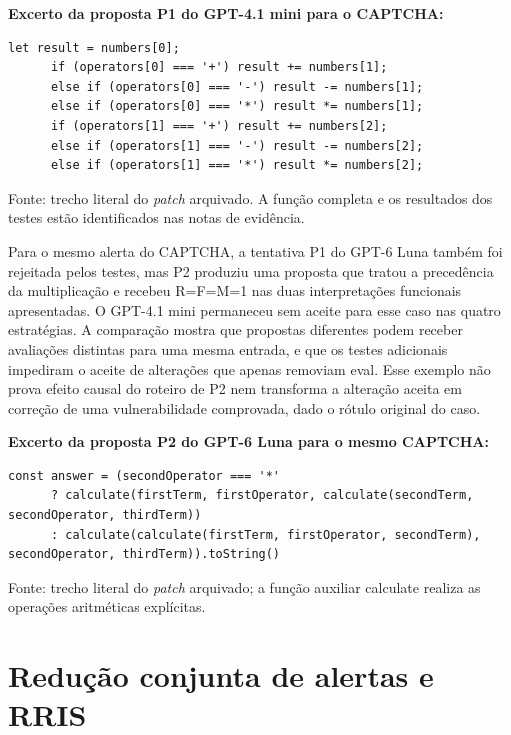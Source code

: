 \textbf{Excerto da proposta P1 do GPT-4.1 mini para o CAPTCHA:}

\begin{lstlisting}[basicstyle=\ttfamily\footnotesize,breaklines=true,columns=fullflexible,keepspaces=true,showstringspaces=false]
      let result = numbers[0];
      if (operators[0] === '+') result += numbers[1];
      else if (operators[0] === '-') result -= numbers[1];
      else if (operators[0] === '*') result *= numbers[1];
      if (operators[1] === '+') result += numbers[2];
      else if (operators[1] === '-') result -= numbers[2];
      else if (operators[1] === '*') result *= numbers[2];
\end{lstlisting}

{\footnotesize\noindent Fonte: trecho literal do \textit{patch} arquivado. A função completa e os resultados dos testes estão identificados nas notas de evidência.\par}

Para o mesmo alerta do CAPTCHA, a tentativa P1 do GPT-6 Luna também foi rejeitada pelos testes, mas P2 produziu uma proposta que tratou a precedência da multiplicação e recebeu R=F=M=1 nas duas interpretações funcionais apresentadas. O GPT-4.1 mini permaneceu sem aceite para esse caso nas quatro estratégias. A comparação mostra que propostas diferentes podem receber avaliações distintas para uma mesma entrada, e que os testes adicionais impediram o aceite de alterações que apenas removiam eval. Esse exemplo não prova efeito causal do roteiro de P2 nem transforma a alteração aceita em correção de uma vulnerabilidade comprovada, dado o rótulo original do caso.

\textbf{Excerto da proposta P2 do GPT-6 Luna para o mesmo CAPTCHA:}

\begin{lstlisting}[basicstyle=\ttfamily\footnotesize,breaklines=true,columns=fullflexible,keepspaces=true,showstringspaces=false]
    const answer = (secondOperator === '*'
      ? calculate(firstTerm, firstOperator, calculate(secondTerm, secondOperator, thirdTerm))
      : calculate(calculate(firstTerm, firstOperator, secondTerm), secondOperator, thirdTerm)).toString()
\end{lstlisting}

{\footnotesize\noindent Fonte: trecho literal do \textit{patch} arquivado; a função auxiliar calculate realiza as operações aritméticas explícitas.\par}

\section{Redução conjunta de alertas e RRIS}

